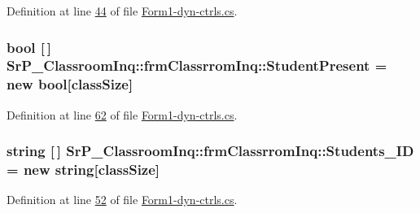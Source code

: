 \-Definition at line \hyperlink{_form1-dyn-ctrls_8cs_source_l00044}{44} of file \hyperlink{_form1-dyn-ctrls_8cs_source}{\-Form1-\/dyn-\/ctrls.\-cs}.

\hypertarget{class_sr_p___classroom_inq_1_1frm_classrrom_inq_aa5c7b55e4b30e09f574c44e90b06e7b2}{
\subsubsection[{\-Student\-Present}]{\setlength{\rightskip}{0pt plus 5cm}bool \mbox{[}$\,$\mbox{]} {\bf \-Sr\-P\-\_\-\-Classroom\-Inq\-::frm\-Classrrom\-Inq\-::\-Student\-Present} = new bool\mbox{[}{\bf class\-Size}\mbox{]}}}
\label{class_sr_p___classroom_inq_1_1frm_classrrom_inq_aa5c7b55e4b30e09f574c44e90b06e7b2}


\-Definition at line \hyperlink{_form1-dyn-ctrls_8cs_source_l00062}{62} of file \hyperlink{_form1-dyn-ctrls_8cs_source}{\-Form1-\/dyn-\/ctrls.\-cs}.

\hypertarget{class_sr_p___classroom_inq_1_1frm_classrrom_inq_a68a93f6247168ebfa500f7afe83cce94}{
\subsubsection[{\-Students\-\_\-\-I\-D}]{\setlength{\rightskip}{0pt plus 5cm}string \mbox{[}$\,$\mbox{]} {\bf \-Sr\-P\-\_\-\-Classroom\-Inq\-::frm\-Classrrom\-Inq\-::\-Students\-\_\-\-I\-D} = new string\mbox{[}{\bf class\-Size}\mbox{]}}}
\label{class_sr_p___classroom_inq_1_1frm_classrrom_inq_a68a93f6247168ebfa500f7afe83cce94}


\-Definition at line \hyperlink{_form1-dyn-ctrls_8cs_source_l00052}{52} of file \hyperlink{_form1-dyn-ctrls_8cs_source}{\-Form1-\/dyn-\/ctrls.\-cs}.

